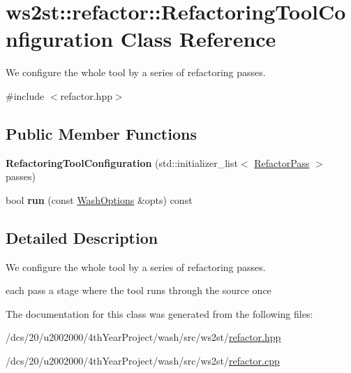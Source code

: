 \hypertarget{classws2st_1_1refactor_1_1RefactoringToolConfiguration}{}\section{ws2st\+:\+:refactor\+:\+:Refactoring\+Tool\+Configuration Class Reference}
\label{classws2st_1_1refactor_1_1RefactoringToolConfiguration}


We configure the whole tool by a series of refactoring passes.  




{\ttfamily \#include $<$refactor.\+hpp$>$}

\subsection*{Public Member Functions}
\begin{DoxyCompactItemize}
\item 
\mbox{\label{classws2st_1_1refactor_1_1RefactoringToolConfiguration_a6170e537d63c130d1224af83a5d0f41f}} 
{\bfseries Refactoring\+Tool\+Configuration} (std\+::initializer\+\_\+list$<$ \mbox{\hyperlink{classws2st_1_1refactor_1_1RefactorPass}{Refactor\+Pass}} $>$ passes)
\item 
\mbox{\label{classws2st_1_1refactor_1_1RefactoringToolConfiguration_a7ff018cf2d0f2ec54274efcfa00df72f}} 
bool {\bfseries run} (const \mbox{\hyperlink{structWashOptions}{Wash\+Options}} \&opts) const
\end{DoxyCompactItemize}


\subsection{Detailed Description}
We configure the whole tool by a series of refactoring passes. 


\begin{DoxyItemize}
\item each pass a stage where the tool runs through the source once 
\end{DoxyItemize}

The documentation for this class was generated from the following files\+:\begin{DoxyCompactItemize}
\item 
/dcs/20/u2002000/4th\+Year\+Project/wash/src/ws2st/\mbox{\hyperlink{refactor_8hpp}{refactor.\+hpp}}\item 
/dcs/20/u2002000/4th\+Year\+Project/wash/src/ws2st/\mbox{\hyperlink{refactor_8cpp}{refactor.\+cpp}}\end{DoxyCompactItemize}
